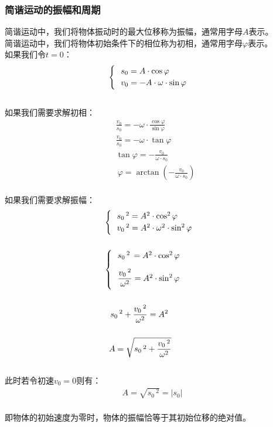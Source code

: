 \documentclass[UTF8]{ctexart}
\begin{document}
\subsubsection{简谐运动的振幅和周期}
    简谐运动中，我们将物体振动时的最大位移称为振幅，通常用字母$A$表示。\\[3mm]
    简谐运动中，我们将物体初始条件下的相位称为初相，通常用字母$\varphi$表示。\\[5mm]
    如果我们令$t=0$：
    \setcounter{equation}{0}
    \begin{align}
        \begin{cases}
            ~~s_0=A\cdot\cos{\varphi}\\
            ~~v_0=-A\cdot\omega\cdot\sin{\varphi}\vspace{1pt}
        \end{cases}
    \end{align}\\
    如果我们需要求解初相：\vspace{5pt}
    \begin{align}
        &\frac{v_0}{s_0}=-\omega\cdot\frac{\cos{\varphi}}{\sin{\varphi}}\\[5mm]
        &\frac{v_0}{s_0}=-\omega\cdot\tan{\varphi}\\[5mm]
        &\tan{\varphi}=-\frac{v_0}{\omega\cdot s_0}\\[3mm]
        &~\varphi=\arctan{\left(-\frac{v_0}{\omega\cdot s_0}\right)}
    \end{align}\\
    如果我们需要求解振幅：\vspace{5pt}
    \begin{align}
        &\begin{cases}
            ~~s_0\,^2=A^2\cdot\cos^2{\varphi}\\
            ~~v_0\,^2=A^2\cdot\omega^2\cdot\sin^2{\varphi}\vspace{1pt}
        \end{cases}\\[5mm]
        &\begin{cases}
            ~~s_0\,^2\,=A^2\cdot\cos^2{\varphi}\\[3mm]
            ~~\dfrac{v_0\,^2}{\omega^2}=A^2\cdot\sin^2{\varphi}\vspace{4pt}
        \end{cases}\\[5mm]
        &~~\,s_0\,^2+\frac{v_0\,^2}{\omega^2}=A^2\\[5mm]
        &~~A=\sqrt{s_0\,^2+\frac{v_0\,^2}{\omega^2}}
    \end{align}\\
    此时若令初速$v_0=0$则有：
    \begin{align}
        A=\sqrt{s_0\,^2}=|s_0|
    \end{align}\\
    即物体的初始速度为零时，物体的振幅恰等于其初始位移的绝对值。
        
\end{document}
